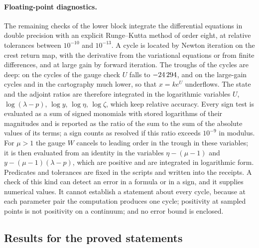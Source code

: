 \paragraph{Floating-point diagnostics.}
The remaining checks of the lower block integrate the differential equations in double precision with an explicit Runge--Kutta method of order eight, at relative tolerances between $10^{-10}$ and $10^{-13}$. A cycle is located by Newton iteration on the crest return map, with the derivative from the variational equations or from finite differences, and at large gain by forward iteration. The troughs of the cycles are deep: on the cycles of the gauge check $U$ falls to $-24\,294$, and on the large-gain cycles and in the cartography much lower, so that $x=ke^U$ underflows. The state and the adjoint ratios are therefore integrated in the logarithmic variables $U$, $\log(\lambda-p)$, $\log y$, $\log\eta$, $\log\zeta$, which keep relative accuracy. Every sign test is evaluated as a sum of signed monomials with stored logarithms of their magnitudes and is reported as the ratio of the sum to the sum of the absolute values of its terms; a sign counts as resolved if this ratio exceeds $10^{-9}$ in modulus. For $\mu>1$ the gauge $W$ cancels to leading order in the trough in these variables; it is then evaluated from an identity in the variables $\eta-(\mu-1)$ and $y-(\mu-1)(\lambda-p)$, which are positive and are integrated in logarithmic form. Predicates and tolerances are fixed in the scripts and written into the receipts. A check of this kind can detect an error in a formula or in a sign, and it supplies numerical values. It cannot establish a statement about every cycle, because at each parameter pair the computation produces one cycle; positivity at sampled points is not positivity on a continuum; and no error bound is enclosed.

\subsection{Results for the proved statements}\label{num:sec:results}
